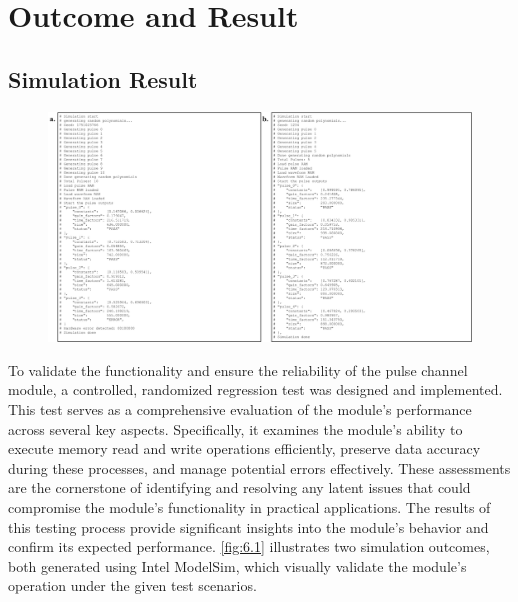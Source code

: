 \chapter{Outcome and Result}

\section{Simulation Result}
\begin{figure}[ht]
    \setlength{\abovecaptionskip}{0pt}    %
    \setlength{\belowcaptionskip}{0pt}    %
    \centering
    \includegraphics[width=1\linewidth]{figures/6.1.png}
    \caption{}
    \label{fig:6.1}
\end{figure}
To validate the functionality and ensure the reliability of the pulse channel module, a controlled, randomized regression test was designed and implemented. This test serves as a comprehensive evaluation of the module’s performance across several key aspects. Specifically, it examines the module's ability to execute memory read and write operations efficiently, preserve data accuracy during these processes, and manage potential errors effectively. These assessments are the cornerstone of identifying and resolving any latent issues that could compromise the module's functionality in practical applications. The results of this testing process provide significant insights into the module's behavior and confirm its expected performance. \autoref{fig:6.1} illustrates two simulation outcomes, both generated using Intel ModelSim, which visually validate the module’s operation under the given test scenarios.

